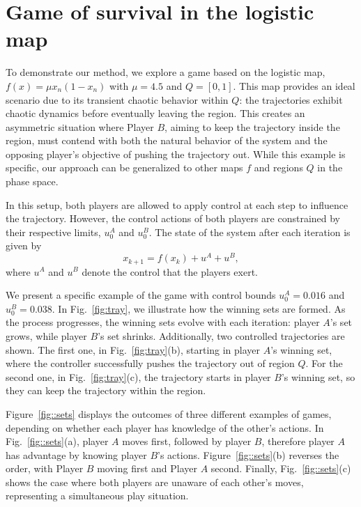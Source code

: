 


\section{Game of survival in the logistic map}

To demonstrate our method, we explore a game based on the logistic map, \linebreak ${f(x) = \mu x_n(1-x_n)}$ with $\mu=4.5$ and $Q=[0,1]$. This map provides an ideal scenario due to its transient chaotic behavior within $Q$: the trajectories exhibit chaotic dynamics before eventually leaving the region. This creates an asymmetric situation where Player $B$, aiming to keep the trajectory inside the region, must contend with both the natural behavior of the system and the opposing player’s objective of pushing the trajectory out. While this example is specific, our approach can be generalized to other maps $f$ and regions $Q$ in the phase space.

In this setup, both players are allowed to apply control at each step to influence the trajectory. However, the control actions of both players are constrained by their respective limits, $u_0^A$ and $u_0^B$. The state of the system after each iteration is given by
\begin{equation}
x_{k+1} = f(x_k) + u^A + u^B,
\end{equation}
where $u^A$ and $u^B$ denote the control that the players exert.

We present a specific example of the game with control bounds $u_0^A = 0.016$ and $u_0^B = 0.038$. In Fig.~\ref{fig:tray}, we illustrate how the winning sets are formed. As the process progresses, the winning sets evolve with each iteration: player $A$’s set grows, while player $B$’s set shrinks. Additionally, two controlled trajectories are shown. The first one, in Fig.~\ref{fig:tray}(b), starting in player $A$’s winning set, where the controller successfully pushes the trajectory out of region $Q$. For the second one, in Fig.~\ref{fig:tray}(c), the trajectory starts in player $B$’s winning set, so they can keep the trajectory within the region.

Figure~\ref{fig::sets} displays the outcomes of three different examples of games, depending on whether each player has knowledge of the other’s actions. In Fig.~\ref{fig::sets}(a), player $A$ moves first, followed by player $B$, therefore player $A$ has advantage by knowing player $B$'s actions. Figure~\ref{fig::sets}(b) reverses the order, with Player $B$ moving first and Player $A$ second. Finally, Fig.~\ref{fig::sets}(c) shows the case where both players are unaware of each other’s moves, representing a simultaneous play situation.

